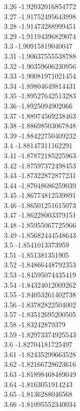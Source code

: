 {3.26	-1.92032016854772\\
3.27	-1.91752495643998\\
3.28	-1.91473288999451\\
3.29	-1.91194396829074\\
3.3	-1.90915819040047\\
3.31	-1.90637555538788\\
3.32	-1.90359606230956\\
3.33	-1.90081971021454\\
3.34	-1.89804649814431\\
3.35	-1.89527642513283\\
3.36	-1.8925094902066\\
3.37	-1.88974569238463\\
3.38	-1.88698503067848\\
3.39	-1.88422750409232\\
3.4	-1.88147311162291\\
3.41	-1.87872185225963\\
3.42	-1.87597372498453\\
3.43	-1.87322872877231\\
3.44	-1.87048686259039\\
3.45	-1.86774812539891\\
3.46	-1.86501251615073\\
3.47	-1.86228003379151\\
3.48	-1.85955067725966\\
3.49	-1.85682444548643\\
3.5	-1.8541013373959\\
3.51	-1.851381351905\\
3.52	-1.84866448792353\\
3.53	-1.84595074435419\\
3.54	-1.84324012009262\\
3.55	-1.84053261402738\\
3.56	-1.83782822504002\\
3.57	-1.83512695200505\\
3.58	-1.83242879379\\
3.59	-1.82973374925543\\
3.6	-1.82704181725497\\
3.61	-1.82435299663528\\
3.62	-1.82166728623616\\
3.63	-1.81898468489049\\
3.64	-1.8163051914243\\
3.65	-1.8136288046568\\
3.66	-1.81095552340034\\
}
